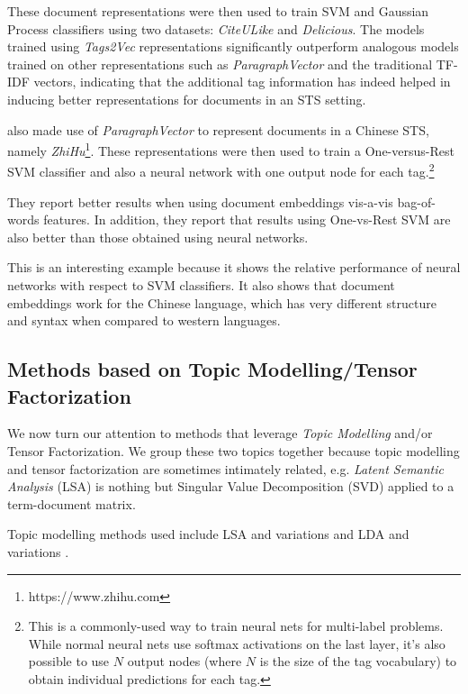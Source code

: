 These document representations were then used to train SVM and Gaussian Process classifiers using two datasets: \textit{CiteULike} and \textit{Delicious}. The models trained using \textit{Tags2Vec} representations significantly outperform analogous models trained on other representations such as \textit{ParagraphVector} and the traditional TF-IDF vectors, indicating that the additional tag information has indeed helped in inducing better representations for documents in an STS setting.

\cite{tao_yao_2016} also made use of \textit{ParagraphVector} to represent documents in a Chinese STS, namely \textit{ZhiHu}\footnote{https://www.zhihu.com}. These representations were then used to train a One-versus-Rest SVM classifier and also a neural network with one output node for each tag.\footnote{This is a commonly-used way to train neural nets for multi-label problems. While normal neural nets use softmax activations on the last layer, it's also possible to use $N$ output nodes (where $N$ is the size of the tag vocabulary) to obtain individual predictions for each tag.}

They report better results when using document embeddings vis-a-vis bag-of-words features. In addition, they report that results using One-vs-Rest SVM are also better than those obtained using neural networks.

This is an interesting example because it shows the relative performance of neural networks with respect to SVM classifiers. It also shows that document embeddings work for the Chinese language, which has very different structure and syntax when compared to western languages.

\subsection{Methods based on Topic Modelling/Tensor Factorization}

We now turn our attention to methods that leverage \textit{Topic Modelling} and/or Tensor Factorization. We group these two topics together because topic modelling and tensor factorization are sometimes intimately related, e.g. \textit{Latent Semantic Analysis} (LSA) \citep{deerwester_etal_1990} is nothing but Singular Value Decomposition (SVD) applied to a term-document matrix.

Topic modelling methods used include LSA and variations \citep{zhang_etal_2014} and LDA and variations \citep{gong_etal_2017,wu_etal_2016,si_sun_2008}.

